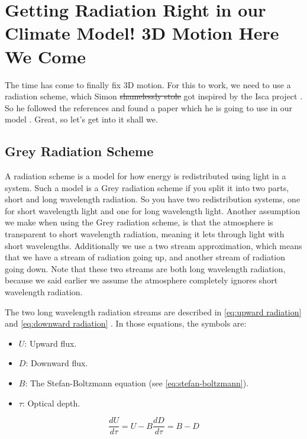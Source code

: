 \section{Getting Radiation Right in our Climate Model! 3D Motion Here We Come} \label{sec:stream8}
The time has come to finally fix 3D motion. For this to work, we need to use a radiation scheme, which Simon \sout{shamelessly stole} got inspired by the Isca project \cite{isca}. So he followed
the references and found a paper which he is going to use in our model \cite{greyRad}. Great, so let's get into it shall we.

\subsection{Grey Radiation Scheme}
A radiation scheme is a model for how energy is redistributed using light in a system. Such a model is a Grey radiation scheme if you split it into two parts, short and long wavelength radiation.
So you have two redistribution systems, one for short wavelength light and one for long wavelength light. Another assumption we make when using the Grey radiation scheme, is that the atmosphere 
is transparent to short wavelength radiation, meaning it lets through light with short wavelengths. Additionally we use a two stream approximation, which means that we have a stream of radiation
going up, and another stream of radiation going down. Note that these two streams are both long wavelength radiation, because we said earlier we assume the atmosphere completely ignores short 
wavelength radiation.

The two long wavelength radiation streams are described in \autoref{eq:upward radiation} and \autoref{eq:downward radiation} \cite{greyRad}. In those equations, the symbols are:

\begin{itemize}
    \item $U$: Upward flux.
    \item $D$: Downward flux.
    \item $B$: The Stefan-Boltzmann equation (see \autoref{eq:stefan-boltzmann}).
    \item $\tau$: Optical depth.
\end{itemize}

\begin{subequations}
    \begin{equation}
        \frac{dU}{d\tau} = U - B
        \label{eq:upward radiation}
    \end{equation}
    \begin{equation}
        \frac{dD}{d\tau} = B - D
        \label{eq:downward radiation}
    \end{equation}
\end{subequations}

